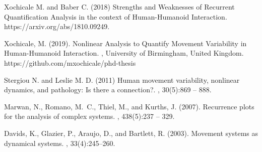 \documentclass[12pt]{article}
\begin{document}
\begin{thebibliography}{9}

Xochicale M. and Baber C. (2018)
\newblock Strengths and Weaknesses of Recurrent Quantification Analysis in the context of Human-Humanoid Interaction.
 https://arxiv.org/abs/1810.09249.

{Xochicale}, M. (2019).
\newblock Nonlinear Analysis to Quantify Movement Variability in Human-Humanoid Interaction.
, University of Birmingham, United Kingdom.
\newblock https://github.com/mxochicale/phd-thesis


Stergiou N. and  Leslie M. D. (2011)
\newblock Human movement variability, nonlinear dynamics, and pathology: Is there a connection?.
, 30(5):869 -- 888.


Marwan, N., Romano, M.~C., Thiel, M., and Kurths, J. (2007).
\newblock Recurrence plots for the analysis of complex systems.
, 438(5):237 -- 329.

Davids, K., Glazier, P., Araujo, D., and Bartlett, R. (2003).
\newblock Movement systems as dynamical systems.
, 33(4):245--260.



\end{thebibliography}
\end{document}
